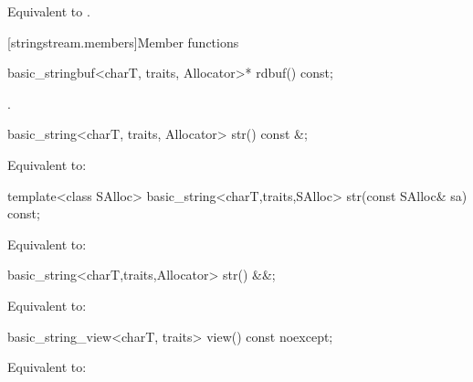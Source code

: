 \begin{itemdescr}
\pnum
\effects
Equivalent to .
\end{itemdescr}

[stringstream.members]{Member functions}

%
\begin{itemdecl}
basic_stringbuf<charT, traits, Allocator>* rdbuf() const;
\end{itemdecl}

\begin{itemdescr}
\pnum
\returns
{}.
\end{itemdescr}

%
\begin{itemdecl}
basic_string<charT, traits, Allocator> str() const &;
\end{itemdecl}

\begin{itemdescr}
\pnum
\effects
Equivalent to: 
\end{itemdescr}

%
\begin{itemdecl}
template<class SAlloc>
  basic_string<charT,traits,SAlloc> str(const SAlloc& sa) const;
\end{itemdecl}

\begin{itemdescr}
\pnum
\effects
Equivalent to: 
\end{itemdescr}

%
\begin{itemdecl}
basic_string<charT,traits,Allocator> str() &&;
\end{itemdecl}

\begin{itemdescr}
\pnum
\effects
Equivalent to: 
\end{itemdescr}

%
\begin{itemdecl}
basic_string_view<charT, traits> view() const noexcept;
\end{itemdecl}

\begin{itemdescr}
\pnum
\effects
Equivalent to: 
\end{itemdescr}


